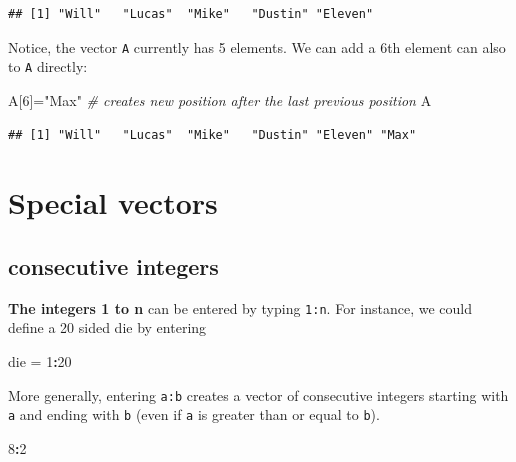 \documentclass[
]{book}
\newenvironment{Shaded}{\begin{snugshade}}{\end{snugshade}}
\newcommand{\CommentTok}[1]{\textcolor[rgb]{0.56,0.35,0.01}{\textit{#1}}}
\newcommand{\DecValTok}[1]{\textcolor[rgb]{0.00,0.00,0.81}{#1}}
\newcommand{\NormalTok}[1]{#1}
\newcommand{\OtherTok}[1]{\textcolor[rgb]{0.56,0.35,0.01}{#1}}
\newcommand{\SpecialCharTok}[1]{\textcolor[rgb]{0.81,0.36,0.00}{\textbf{#1}}}
\newcommand{\StringTok}[1]{\textcolor[rgb]{0.31,0.60,0.02}{#1}}
\theoremstyle{definition}
\theoremstyle{definition}
\theoremstyle{definition}
\theoremstyle{definition}
\theoremstyle{remark}
\begin{document}
\begin{verbatim}
## [1] "Will"   "Lucas"  "Mike"   "Dustin" "Eleven"
\end{verbatim}

Notice, the vector \texttt{A} currently has 5 elements. We can add a 6th element can also to \texttt{A} directly:

\begin{Shaded}
\begin{Highlighting}[]
\NormalTok{A[}\DecValTok{6}\NormalTok{]}\OtherTok{=}\StringTok{"Max"} \CommentTok{\# creates new position after the last previous position}
\NormalTok{A}
\end{Highlighting}
\end{Shaded}

\begin{verbatim}
## [1] "Will"   "Lucas"  "Mike"   "Dustin" "Eleven" "Max"
\end{verbatim}

\section{Special vectors}\label{special-vectors}

\subsection*{consecutive integers}\label{consecutive-integers}

\textbf{The integers 1 to n} can be entered by typing \texttt{1:n}. For instance, we could define a 20 sided die by entering

\begin{Shaded}
\begin{Highlighting}[]
\NormalTok{die }\OtherTok{=} \DecValTok{1}\SpecialCharTok{:}\DecValTok{20}
\end{Highlighting}
\end{Shaded}

More generally, entering \texttt{a:b} creates a vector of consecutive integers starting with \texttt{a} and ending with \texttt{b} (even if \texttt{a} is greater than or equal to \texttt{b}).

\begin{Shaded}
\begin{Highlighting}[]
\DecValTok{8}\SpecialCharTok{:}\DecValTok{2}
\end{Highlighting}
\end{Shaded}
\end{document}
